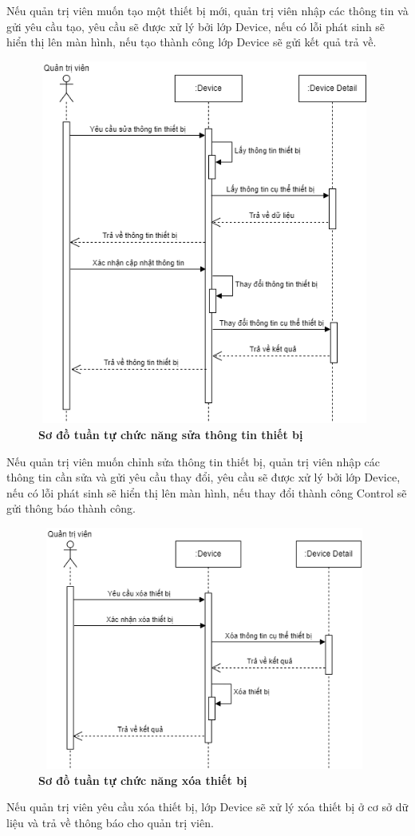 Nếu quản trị viên muốn tạo một thiết bị mới, quản trị viên nhập các thông tin và gửi yêu cầu tạo, yêu cầu sẽ được xử lý bởi lớp Device, nếu có lỗi phát sinh sẽ hiển thị lên màn hình, 
nếu tạo thành công lớp Device sẽ gửi kết quả trả về. 
\begin{figure}[H]
  \centering
  \includegraphics[width=11cm,height=12cm]{Images/sequence/sequence_manage_edit_device.png}
  \caption[Sơ đồ tuần tự chức năng sửa thông tin thiết bị]{\bfseries \fontsize{12pt}{0pt}
  \selectfont Sơ đồ tuần tự chức năng sửa thông tin thiết bị}
  \label{sequence_manage_edit_device} %
\end{figure}
Nếu quản trị viên muốn chỉnh sửa thông tin thiết bị, quản trị viên nhập các thông tin cần sửa và gửi yêu cầu thay đổi, yêu cầu sẽ được xử lý
bởi lớp Device, nếu có lỗi phát sinh sẽ hiển thị lên màn hình, nếu thay đổi thành công Control sẽ gửi thông báo thành công. 
\begin{figure}[H]
  \centering
  \includegraphics[width=11cm,height=8cm]{Images/sequence/sequence_manage_delete_device.png}
  \caption[Sơ đồ tuần tự chức năng xóa thiết bị]{\bfseries \fontsize{12pt}{0pt}
  \selectfont Sơ đồ tuần tự chức năng xóa thiết bị}
  \label{sequence_manage_delete_device} %
\end{figure}
Nếu quản trị viên yêu cầu xóa thiết bị, lớp Device sẽ xử lý xóa thiết bị ở cơ sở dữ liệu và trả về thông báo cho quản trị viên.


